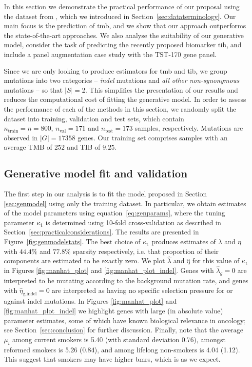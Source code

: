 \documentclass[../thesis.tex]{subfiles}
\begin{document}
In this section we demonstrate the practical performance of our proposal using the dataset from \citet{campbell_distinct_2016}, which we introduced in Section~\ref{sec:dataterminology}. Our main focus is the prediction of \gls{tmb}, and we show that our approach outperforms the state-of-the-art approaches. We also analyse the suitability of our generative model, consider the task of predicting the recently proposed biomarker \gls{tib}, and include a panel augmentation case study with the {TST-170} gene panel.

Since we are only looking to produce estimators for \gls{tmb} and \gls{tib}, we group mutations into two categories -- \emph{indel} mutations and \emph{all other non-synonymous} mutations -- so that $|S|=2$.  This simplifies the presentation of our results and reduces the computational cost of fitting the generative model.  In order to assess the performance of each of the methods in this section, we randomly split the dataset into training, validation and test sets, which contain $n_{\text{train}} = n = 800, \ n_{\text{val}} =  171$ and $n_{\text{test}} = 173$ samples, respectively.  Mutations are observed in $|G| = 17358$ genes. Our training set comprises samples with an average TMB of $252$ and TIB of $9.25$. 


\subsection{Generative model fit and validation \label{sec:genmodelfit}}

The first step in our analysis is to fit the model proposed in Section \ref{sec:genmodel} using only the training dataset. In particular, we obtain estimates of the model parameters using equation~\eqref{eq:genparams}, where the tuning parameter $\kappa_1$ is determined using 10-fold cross-validation as described in Section~\ref{sec:practicalconsiderations}.  The results are presented in Figure~\ref{fig:genmodelstats}. The best choice of $\kappa_1$ produces estimates of $\lambda$ and $\eta$ with $44.4 \%$ and $77.8 \%$ sparsity respectively, i.e. that proportion of their components are estimated to be exactly zero. We plot $\hat{\lambda}$ and $\hat{\eta}$ for this value of $\kappa_1$ in Figures \ref{fig:manhat_plot} and \ref{fig:manhat_plot_indel}. Genes with $\hat{\lambda}_g = 0$ are interpreted to be mutating according to the background mutation rate, and genes with $\hat{\eta}_{\text{g,indel}} = 0$ are interpreted as having no specific selection pressure for or against indel mutations. In Figures \ref{fig:manhat_plot} and \ref{fig:manhat_plot_indel} we highlight genes with large (in absolute value) parameter estimates, some of which have known biological relevance in oncology; see Section~\ref{sec:conclusion} for further discussion. {Finally, note that the average $\mu_i$ among current smokers is 5.40 (with standard deviation 0.76), amongst reformed smokers is 5.26 (0.84), and among lifelong non-smokers is 4.04 (1.12). This suggest that smokers may have higher \gls{bmr}s, which is as we expect.}
\end{document}
